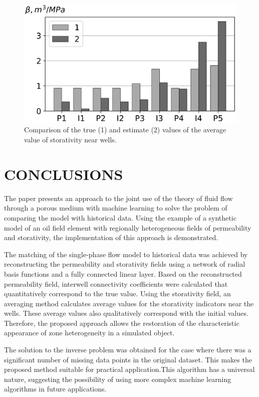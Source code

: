 \documentclass[
11pt,%
tightenlines,%
twoside,%
onecolumn,%
nofloats,%
nobibnotes,%
nofootinbib,%
superscriptaddress,%
noshowpacs,%
centertags]%
{revtex4}
\begin{document}
\begin{figure}
	\centering
	\includegraphics[width=0.7\linewidth]{images/fig7.eps}
	\caption{Comparison of the true (1) and estimate (2) values of the average value of storativity near wells.}
	\label{fig:hist}
\end{figure}

\section{CONCLUSIONS}

The paper presents an approach to the joint use of the theory of fluid flow through a porous medium with machine learning to solve the problem of comparing the model with historical data. Using the example of a synthetic model of an oil field element with regionally heterogeneous fields of permeability and storativity, the implementation of this approach is demonstrated.

The matching of the single-phase flow model to historical data was achieved by reconstructing the permeability and storativity fields using a network of radial basis functions and a fully connected linear layer. Based on the reconstructed permeability field, interwell connectivity coefficients were calculated that quantitatively correspond to the true value. Using the storativity field, an averaging method calculates average values for the storativity indicators near the wells. These average values also qualitatively correspond with the initial values. Therefore, the proposed approach allows the restoration of the characteristic appearance of zone heterogeneity in a simulated object.

The solution to the inverse problem was obtained for the case where there was a significant number of missing data points in the original dataset. This makes the proposed method suitable for practical application.This algorithm has a universal nature, suggesting the possibility of using more complex machine learning algorithms in future applications.
\end{document}
